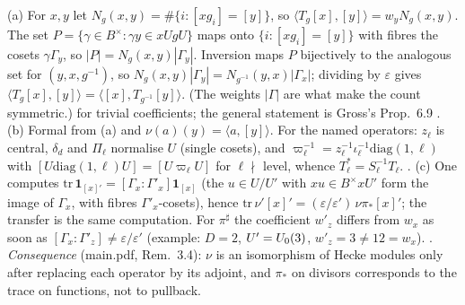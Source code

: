 \begin{outline}
(a) For $x,y$ let $N_g(x,y)=\#\{i:[xg_i]=[y]\}$, so $\langle T_g[x],[y]\rangle=w_yN_g(x,y)$. The set $P=\{\gamma\in B^\times:\gamma y\in xUgU\}$ maps onto
$\{i:[xg_i]=[y]\}$ with fibres the cosets $\gamma\Gamma_y$, so $|P|=N_g(x,y)|\Gamma_y|$. Inversion maps $P$ bijectively to the analogous set for
$(y,x,g^{-1})$, so $N_g(x,y)|\Gamma_y|=N_{g^{-1}}(y,x)|\Gamma_x|$; dividing by $\varepsilon$ gives
$\langle T_g[x],[y]\rangle=\langle[x],T_{g^{-1}}[y]\rangle$. (The weights $|\Gamma|$ are what make the count symmetric.) \stproved{} for trivial
coefficients; the general statement is Gross's Prop.~6.9 \cite[Prop.~6.9]{Gr99} \stcited.
(b) Formal from (a) and $\nu(a)(y)=\langle a,[y]\rangle$. For the named operators: $z_\ell$ is central, $\delta_d$ and $\Pi_\ell$ normalise $U$
(single cosets), and $\varpi_\ell^{-1}=z_\ell^{-1}\iota_\ell^{-1}\mathrm{diag}(1,\ell)$ with $[U\mathrm{diag}(1,\ell)U]=[U\varpi_\ell U]$ for $\ell\nmid$ level,
whence $T_\ell^*=S_\ell^{-1}T_\ell$. \stproved.
(c) One computes $\mathrm{tr}\,\mathbf 1_{[x]'}=[\Gamma_x:\Gamma'_x]\mathbf 1_{[x]}$ (the $u\in U/U'$ with $xu\in B^\times xU'$ form the image of $\Gamma_x$, with
fibres $\Gamma'_x$-cosets), hence $\mathrm{tr}\,\nu'[x]'=(\varepsilon/\varepsilon')\,\nu\pi_*[x]'$; the transfer is the same computation. For $\pi^\sharp$
the coefficient $w'_z$ differs from $w_x$ as soon as $[\Gamma_x:\Gamma'_z]\ne\varepsilon/\varepsilon'$ (example: $D=2$, $U'=U_0(3)$, $w'_z=3\ne12=w_x$). \stproved.
\emph{Consequence} (main.pdf, Rem.~3.4): $\nu$ is an isomorphism of Hecke modules only after replacing each operator by its adjoint, and
$\pi_*$ on divisors corresponds to the trace on functions, not to pullback.
\end{outline}

